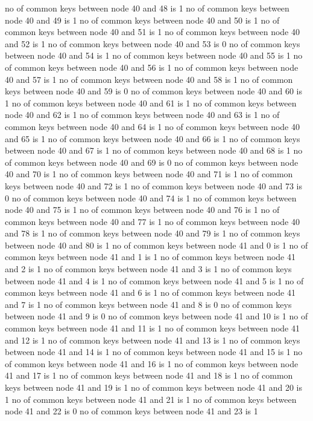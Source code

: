 no of common keys between node 40 and 48 is 1
no of common keys between node 40 and 49 is 1
no of common keys between node 40 and 50 is 1
no of common keys between node 40 and 51 is 1
no of common keys between node 40 and 52 is 1
no of common keys between node 40 and 53 is 0
no of common keys between node 40 and 54 is 1
no of common keys between node 40 and 55 is 1
no of common keys between node 40 and 56 is 1
no of common keys between node 40 and 57 is 1
no of common keys between node 40 and 58 is 1
no of common keys between node 40 and 59 is 0
no of common keys between node 40 and 60 is 1
no of common keys between node 40 and 61 is 1
no of common keys between node 40 and 62 is 1
no of common keys between node 40 and 63 is 1
no of common keys between node 40 and 64 is 1
no of common keys between node 40 and 65 is 1
no of common keys between node 40 and 66 is 1
no of common keys between node 40 and 67 is 1
no of common keys between node 40 and 68 is 1
no of common keys between node 40 and 69 is 0
no of common keys between node 40 and 70 is 1
no of common keys between node 40 and 71 is 1
no of common keys between node 40 and 72 is 1
no of common keys between node 40 and 73 is 0
no of common keys between node 40 and 74 is 1
no of common keys between node 40 and 75 is 1
no of common keys between node 40 and 76 is 1
no of common keys between node 40 and 77 is 1
no of common keys between node 40 and 78 is 1
no of common keys between node 40 and 79 is 1
no of common keys between node 40 and 80 is 1
no of common keys between node 41 and 0 is 1
no of common keys between node 41 and 1 is 1
no of common keys between node 41 and 2 is 1
no of common keys between node 41 and 3 is 1
no of common keys between node 41 and 4 is 1
no of common keys between node 41 and 5 is 1
no of common keys between node 41 and 6 is 1
no of common keys between node 41 and 7 is 1
no of common keys between node 41 and 8 is 0
no of common keys between node 41 and 9 is 0
no of common keys between node 41 and 10 is 1
no of common keys between node 41 and 11 is 1
no of common keys between node 41 and 12 is 1
no of common keys between node 41 and 13 is 1
no of common keys between node 41 and 14 is 1
no of common keys between node 41 and 15 is 1
no of common keys between node 41 and 16 is 1
no of common keys between node 41 and 17 is 1
no of common keys between node 41 and 18 is 1
no of common keys between node 41 and 19 is 1
no of common keys between node 41 and 20 is 1
no of common keys between node 41 and 21 is 1
no of common keys between node 41 and 22 is 0
no of common keys between node 41 and 23 is 1
